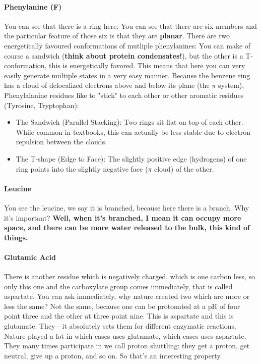 \paragraph{Phenylanine (F)}
 You can see that there is a ring here. You can see that there are six members and the particular feature of those six is that they are \textbf{planar}. There are two energetically favoured conformations of mutliple phenylanines: You can make of course a sandwich (\textbf{think about protein condensates!}), but the other is a T-conformation, this is energetically favored. This means that here you can very easily generate multiple states in a very easy manner. Because the benzene ring has a cloud of delocalized electrons above and below its plane (the $\pi$ system), Phenylalanine residues like to "stick" to each other or other aromatic residues (Tyrosine, Tryptophan):
\begin{itemize}
    \item The Sandwich (Parallel Stacking): Two rings sit flat on top of each other. While common in textbooks, this can actually be less stable due to electron repulsion between the clouds.
    \item The T-shape (Edge to Face):  The slightly positive edge (hydrogens) of one ring points into the slightly negative face ($\pi$ cloud) of the other.
\end{itemize}
\paragraph{Leucine}
You see the leucine, we say it is branched, because here there is a branch. Why it's important? \textbf{Well, when it's branched, I mean it can occupy more space, and there can be more water released to the bulk, this kind of things.}
\paragraph{Glutamic Acid}
There is another residue which is negatively charged, which is one carbon less, so only this one and the carboxylate group comes immediately, that is called aspartate. You can ask immediately, why nature created two which are more or less the same? Not the same, because one can be protonated at a pH of four point three and the other at three point nine. This is aspartate and this is glutamate. They—it absolutely sets them for different enzymatic reactions. Nature played a lot in which cases uses glutamate, which cases uses aspartate. They many times participate in we call proton shuttling: they get a proton, get neutral, give up a proton, and so on. So that's an interesting property. 
